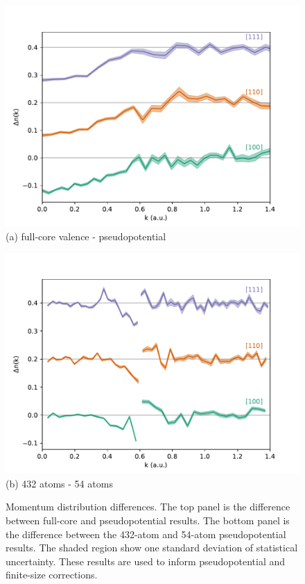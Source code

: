 \documentclass[aps,prb,showpacs,preprintnumbers,amsmath,amssymb,superscriptaddress,twocolumn]{revtex4-1}
\begin{document}
\begin{figure}
\begin{minipage}{\columnwidth}
\includegraphics[width=\linewidth]{li57_dmcfc-ppc-dir}
(a) full-core valence - pseudopotential
\end{minipage}
\begin{minipage}{\columnwidth}
\includegraphics[width=\linewidth]{li52g_bfd-crystal-n54-n432-dnk}
(b) 432 atoms - 54 atoms
\end{minipage}
\caption{Momentum distribution differences. The top panel is the difference between full-core and pseudopotential results. The bottom panel is the difference between the 432-atom and 54-atom pseudopotential results. The shaded region show one standard deviation of statistical uncertainty. These results are used to inform pseudopotential and finite-size corrections. \label{fig:dnk}}
\end{figure}
\end{document}
